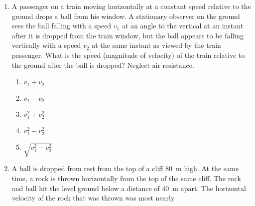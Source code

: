 \begin{multicols}{2}
\begin{enumerate}[leftmargin=12pt]
  \item A passenger on a train moving horizontally at a constant speed
    relative to the ground drops a ball from his window. A stationary observer
    on the ground sees the ball falling with a speed $v_1$ at an angle to
    the vertical at an instant after it is dropped from the train window, but
    the ball appears to be falling vertically with a speed $v_2$ at the same
    instant as viewed by the train passenger. What is the speed (magnitude of
    velocity) of the train relative to the ground after the ball is dropped?
    Neglect air resistance.
    \begin{enumerate}[noitemsep]
    \item $v_1 + v_2$
    \item $v_1-v_2$
    \item $v_1^2 + v_2^2$
    \item $v_1^2-v_2^2$
    \item $\sqrt{v_1^2-v_2^2}$
    \end{enumerate}
    
  \item A ball is dropped from rest from the top of a cliff \SI{80}{\metre}
    high. At the same time, a rock is thrown horizontally from the top of the
    same cliff. The rock and ball hit the level ground below a distance of
    \SI{40}{\metre} apart. The horizontal velocity of the rock that was thrown
    was most nearly
    \begin{center}
    \end{center}
  

\end{enumerate}
\end{multicols}
